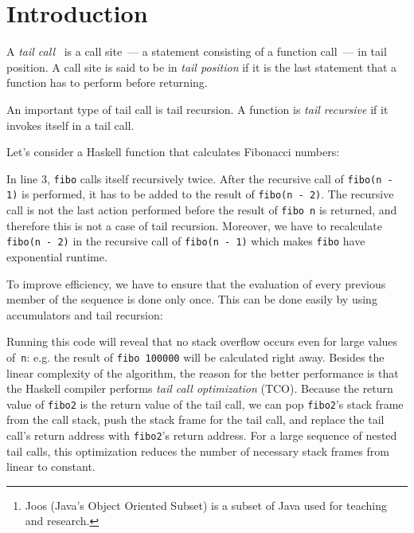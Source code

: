 \documentclass{tufte-handout}
\begin{document}
\thispagestyle{empty}
\maketitle%

\begin{abstract}
\noindent This project aims to implement tail call optimization for \textit{Juice}, a compiler from Joos\footnote{Joos (Java's Object Oriented Subset) is a subset of Java used for teaching and research.} to Assembly. Tail call optimization allows writing deeply recursive functions without overflowing the stack.
\end{abstract}

\tableofcontents

\section{Introduction}

A \textit{tail call}%
\ is a call site~--- a statement consisting of a function call~--- in tail position. A call site is said to be in \textit{tail position} if it is the last statement that a function has to perform before returning.

An important type of tail call is tail recursion. A function is \textit{tail recursive}
if it invokes itself in a tail call.

Let's consider a Haskell function that calculates Fibonacci numbers:


\noindent In line 3, \verb'fibo' calls itself recursively twice. After the recursive call of \verb'fibo(n - 1)' is performed, it has to be added to the result of \verb'fibo(n - 2)'. The recursive call is
not the last action performed before the result of \verb'fibo n' is returned, and therefore this is not a case of tail recursion. Moreover, we have to recalculate \verb'fibo(n - 2)' in the recursive call of \verb'fibo(n - 1)' which makes \verb'fibo' have exponential runtime.

To improve efficiency, we have to ensure that the evaluation of every previous member of the sequence is done only once. This can be done easily by using accumulators and tail recursion:


\noindent Running this code will reveal that no stack overflow occurs even for large values of~\verb'n': e.g. the result of \verb'fibo 100000' will be calculated right away. Besides the linear complexity of the algorithm, the reason for the better performance is that the Haskell compiler performs \textit{tail call optimization} (TCO).
Because the return value of \verb'fibo2' is the return value of the tail call, we can pop \verb'fibo2''s stack frame from the call stack, push the stack frame for the tail call, and replace the tail call's return address with \verb'fibo2''s return address. For a large sequence of nested tail calls, this optimization reduces the number of necessary stack frames from linear to constant.
\end{document}
